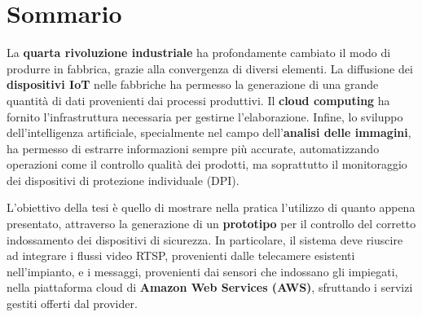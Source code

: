 \chapter*{Sommario}



La \textbf{quarta rivoluzione industriale} ha profondamente cambiato il modo di produrre in fabbrica, grazie alla convergenza di diversi elementi. La diffusione dei \textbf{dispositivi IoT} nelle fabbriche ha permesso la generazione di una grande quantità di dati provenienti dai processi produttivi. Il \textbf{cloud computing} ha fornito l'infrastruttura necessaria per gestirne l'elaborazione. Infine, lo sviluppo dell'intelligenza artificiale, specialmente nel campo dell'\textbf{analisi delle immagini}, ha permesso di estrarre informazioni sempre più accurate, automatizzando operazioni come il controllo qualità dei prodotti, ma soprattutto il monitoraggio dei dispositivi di protezione individuale (DPI).


L'obiettivo della tesi è quello di mostrare nella pratica l'utilizzo di quanto appena presentato, attraverso la generazione di un \textbf{prototipo} per il controllo del corretto indossamento dei dispositivi di sicurezza. In particolare, il sistema deve riuscire ad integrare i flussi video RTSP, provenienti dalle telecamere esistenti nell'impianto, e i messaggi, provenienti dai sensori che indossano gli impiegati, nella piattaforma cloud di \textbf{Amazon Web Services (AWS)}, sfruttando i servizi gestiti offerti dal provider. 


